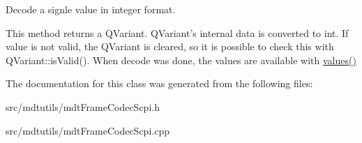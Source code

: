Decode a signle value in integer format. 

This method returns a QVariant. QVariant's internal data is converted to int. If value is not valid, the QVariant is cleared, so it is possible to check this with QVariant::isValid(). When decode was done, the values are available with \hyperlink{classmdt_frame_codec_a599a46e2d7cb5f80bd80e303236ead73}{values()} 

The documentation for this class was generated from the following files:\begin{DoxyCompactItemize}
\item 
src/mdtutils/mdtFrameCodecScpi.h\item 
src/mdtutils/mdtFrameCodecScpi.cpp\end{DoxyCompactItemize}
